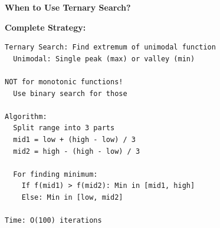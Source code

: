 \documentclass[11pt,a4paper,oneside]{book}
\begin{document}
\begin{tcolorbox}[
    enhanced,breakable,
    colback=dangered!10,
    colframe=dangered,
    boxrule=2pt,
    arc=4mm,
    title=\textbf{Complete Ternary Search Algorithms}
]
\textbf{When to Use Ternary Search?}

\textbf{Complete Strategy:}
\begin{verbatim}
Ternary Search: Find extremum of unimodal function
  Unimodal: Single peak (max) or valley (min)
  
NOT for monotonic functions!
  Use binary search for those

Algorithm:
  Split range into 3 parts
  mid1 = low + (high - low) / 3
  mid2 = high - (high - low) / 3
  
  For finding minimum:
    If f(mid1) > f(mid2): Min in [mid1, high]
    Else: Min in [low, mid2]

Time: O(100) iterations
\end{verbatim}
\end{tcolorbox}
\end{document}

